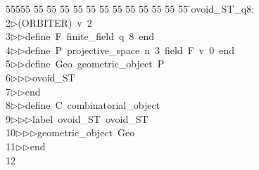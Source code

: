 %
%
\begin{tabbing}
55555 \= 55 \= 55 \= 55 \= 55 \= 55 \= 55 \= 55 \= 55 \= 55 \= 55 \= 55 \= 55 \= \>ovoid\_ST\_q8:\\[0pt]
2\>$\triangleright$\>(ORBITER)\ v\ 2\ \\[0pt]
3\>$\triangleright$\>$\triangleright$\>define\ F\ finite\_field\ q\ 8\ end\ \\[0pt]
4\>$\triangleright$\>$\triangleright$\>define\ P\ projective\_space\ n\ 3\ field\ F\ v\ 0\ end\ \\[0pt]
5\>$\triangleright$\>$\triangleright$\>define\ Geo\ geometric\_object\ P\ \\[0pt]
6\>$\triangleright$\>$\triangleright$\>$\triangleright$\>ovoid\_ST\ \\[0pt]
7\>$\triangleright$\>$\triangleright$\>end\ \\[0pt]
8\>$\triangleright$\>$\triangleright$\>define\ C\ combinatorial\_object\ \\[0pt]
9\>$\triangleright$\>$\triangleright$\>$\triangleright$\>label\ ovoid\_ST\ ovoid\_ST\ \\[0pt]
10\>$\triangleright$\>$\triangleright$\>$\triangleright$\>geometric\_object\ Geo\ \\[0pt]
11\>$\triangleright$\>$\triangleright$\>end\\[0pt]
12\>\end{tabbing}
